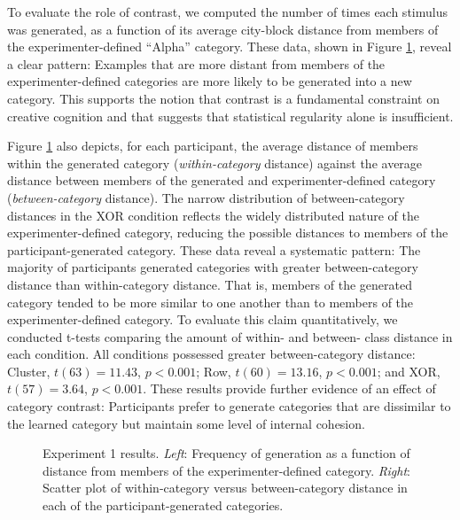 \documentclass[12pt]{article}
\newcommand\inputpgf[2]{{
\let\pgfimageWithoutPath\pgfimage
\renewcommand{\pgfimage}[2][]{\pgfimageWithoutPath[##1]{#1/##2}}

}}
\begin{document}
\begin{flushleft}
To evaluate the role of contrast, we computed the number of times each stimulus was generated, as a function of its average city-block distance from members of the experimenter-defined ``Alpha'' category. These data, shown in Figure \ref{fig:e1-distanceplots}, reveal a clear pattern: Examples that are more distant from members of the experimenter-defined categories are more likely to be generated into a new category. This supports the notion that contrast is a fundamental constraint on creative cognition and that suggests that statistical regularity alone is insufficient.


Figure \ref{fig:e1-distanceplots} also depicts, for each participant, the average distance of members within the generated category ({\em within-category} distance) against the average distance between members of the generated and experimenter-defined category ({\em between-category} distance). The narrow distribution of between-category distances in the XOR condition reflects the widely distributed nature of the experimenter-defined category, reducing the possible distances to members of the participant-generated category. These data reveal a systematic pattern: The majority of participants generated categories with greater between-category distance than within-category distance. That is, members of the generated category tended to be more similar to one another than to members of the experimenter-defined category. To evaluate this claim quantitatively, we conducted t-tests comparing the amount of within- and between- class distance in each condition. All conditions possessed greater between-category distance: Cluster, $t(63) = 11.43$, $p < 0.001$; Row, $t(60) = 13.16$, $p < 0.001$; and XOR, $t(57) = 3.64$, $p < 0.001$.  These results provide further evidence of an effect of category contrast: Participants prefer to generate categories that are dissimilar to the learned category but maintain some level of internal cohesion. 

\begin{figure}
    \begin{center}
    \inputpgf{figs/}{e1-distanceplots.pgf}
    \caption{Experiment 1 results. {\em Left}: Frequency of generation as a function of distance from members of the experimenter-defined category. {\em Right}: Scatter plot of within-category versus between-category distance in each of the participant-generated categories.}
    \label{fig:e1-distanceplots}
    \end{center}
\end{figure}


\end{flushleft}
\end{document}
